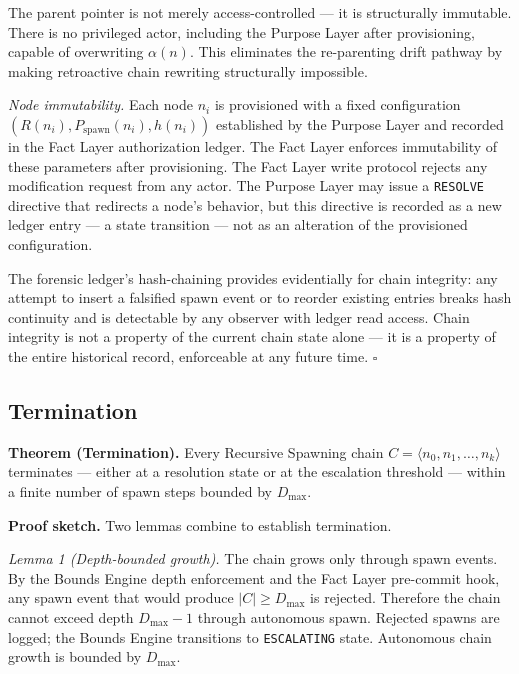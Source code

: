 The parent pointer is not merely access-controlled — it is structurally immutable. There is no privileged actor, including the Purpose Layer after provisioning, capable of overwriting $\alpha(n)$. This eliminates the re-parenting drift pathway by making retroactive chain rewriting structurally impossible.

\medskip
\textit{Node immutability.} Each node $n_i$ is provisioned with a fixed configuration $(R(n_i), P_{\mathrm{spawn}}(n_i), h(n_i))$ established by the Purpose Layer and recorded in the Fact Layer authorization ledger. The Fact Layer enforces immutability of these parameters after provisioning. The Fact Layer write protocol rejects any modification request from any actor. The Purpose Layer may issue a \texttt{RESOLVE} directive that redirects a node's behavior, but this directive is recorded as a new ledger entry — a state transition — not as an alteration of the provisioned configuration.

The forensic ledger's hash-chaining provides evidentially for chain integrity: any attempt to insert a falsified spawn event or to reorder existing entries breaks hash continuity and is detectable by any observer with ledger read access. Chain integrity is not a property of the current chain state alone — it is a property of the entire historical record, enforceable at any future time. $\square$

\subsection{Termination}
\label{sec:rs-termination}

\noindent\textbf{Theorem (Termination).} Every Recursive Spawning chain $C = \langle n_0, n_1, \ldots, n_k \rangle$ terminates — either at a resolution state or at the escalation threshold — within a finite number of spawn steps bounded by $D_{\mathrm{max}}$.

\medskip
\noindent\textbf{Proof sketch.} Two lemmas combine to establish termination.

\medskip
\textit{Lemma 1 (Depth-bounded growth).} The chain grows only through spawn events. By the Bounds Engine depth enforcement and the Fact Layer pre-commit hook, any spawn event that would produce $|C| \geq D_{\mathrm{max}}$ is rejected. Therefore the chain cannot exceed depth $D_{\mathrm{max}} - 1$ through autonomous spawn. Rejected spawns are logged; the Bounds Engine transitions to \texttt{ESCALATING} state. Autonomous chain growth is bounded by $D_{\mathrm{max}}$.

